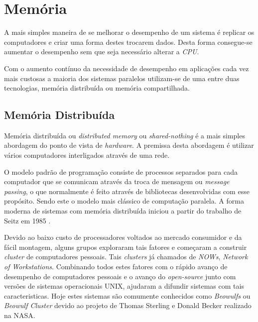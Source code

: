 \chapter{Memória}

A mais simples maneira de se melhorar o desempenho de um sistema é
replicar os computadores e criar uma forma destes trocarem dados.
Desta forma consegue-se aumentar o desempenho sem que seja necessário alterar a
\textit{CPU}.

Com o aumento contínuo da necessidade de desempenho em aplicações cada vez mais
custosas a maioria dos sistemas paralelos utilizam-se de uma entre duas
tecnologias, memória distribuída ou memória compartilhada.


\section{Memória Distribuída}

Memória distribuída ou \textit{distributed memory} ou \textit{shared-nothing} é
a mais simples abordagem do ponto de vista de \textit{hardware}. 
A premissa desta abordagem é utilizar vários computadores interligados através 
de uma rede.

O modelo padrão de programação consiste de processos separados para cada
computador que se comunicam através da troca de mensagem ou 
\textit{message passing}, o que normalmente é feito através de bibliotecas
desenvolvidas com esse propósito. 
Sendo este o modelo mais clássico de computação paralela. 
A forma moderna de sistemas com memória distribuída iniciou a partir do trabalho 
de Seitz em 1985 \cite{Seitz:1985}.

Devido ao baixo custo de processadores voltados ao mercado consumidor e da fácil
montagem, alguns grupos exploraram tais fatores e começaram a construir
\textit{cluster} de computadores pessoais. 
Tais \textit{clusters} já chamados de \textit{NOWs}, 
\textit{Network of Workstations}.
Combinando todos estes fatores com o rápido avanço de desempenho de computadores
pessoais e o avanço do \textit{open-source} junto com  versões de sistemas 
operacionais UNIX, ajudaram a difundir sistemas com tais caracteristicas. 
Hoje estes sistemas são comumente conhecidos como \textit{Beowulfs} ou
\textit{Beowulf Cluster} devido ao projeto de Thomas Sterling e Donald Becker
realizado na NASA.

